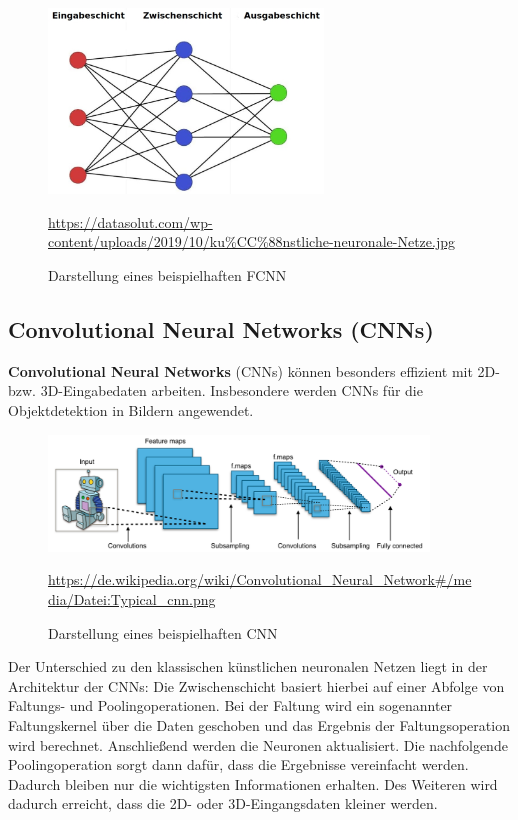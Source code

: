 	\begin{figure}[H]
		\centering
		\includegraphics[width=0.65\textwidth]{kapitel3/images/Simples_Neuronales_Netz.jpg}
		\caption{Darstellung eines beispielhaften FCNN}
		\vspace{0.2cm}
		\quelle\url{https://datasolut.com/wp-content/uploads/2019/10/ku%CC%88nstliche-neuronale-Netze.jpg}
	\end{figure}

\subsection{Convolutional Neural Networks (CNNs)}

	\textbf{Convolutional Neural Networks} (CNNs) können besonders effizient mit 2D- bzw. 3D-Eingabedaten arbeiten. Insbesondere werden CNNs für die Objektdetektion in Bildern angewendet. \cite{datasolut4} \\
	
	\begin{figure}[H]
		\centering
		\includegraphics[width=0.9\textwidth]{kapitel3/images/cnn.png}
		\caption{Darstellung eines beispielhaften CNN}
		\vspace{0.2cm}
		\quelle\url{https://de.wikipedia.org/wiki/Convolutional_Neural_Network#/media/Datei:Typical_cnn.png}
	\end{figure}
	
	Der Unterschied zu den klassischen künstlichen neuronalen Netzen liegt in der Architektur der CNNs: Die Zwischenschicht basiert hierbei auf einer Abfolge von Faltungs- und Poolingoperationen. Bei der Faltung wird ein sogenannter Faltungskernel über die Daten geschoben und das Ergebnis der Faltungsoperation wird berechnet. Anschließend werden die Neuronen aktualisiert. Die nachfolgende Poolingoperation sorgt dann dafür, dass die Ergebnisse vereinfacht werden. Dadurch bleiben nur die wichtigsten Informationen erhalten.	Des Weiteren wird dadurch erreicht, dass die 2D- oder 3D-Eingangsdaten kleiner werden. \cite{datasolut4} 

